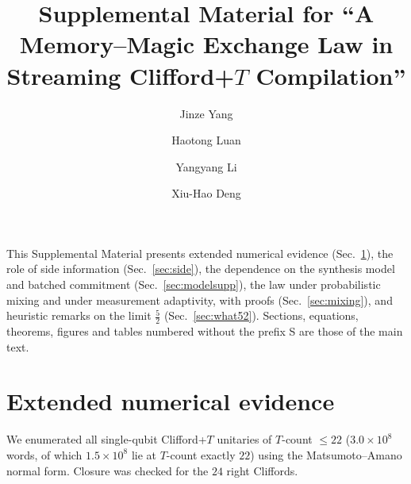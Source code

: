 \documentclass[aps,prx,twocolumn,superscriptaddress,nofootinbib,longbibliography]{revtex4-2}
\theoremstyle{plain}
\theoremstyle{definition}
\theoremstyle{remark}
\begin{document}
\title{Supplemental Material for ``A Memory--Magic Exchange Law in Streaming \texorpdfstring{Clifford+$T$}{Clifford+T} Compilation''}


\author{Jinze Yang}

\author{Haotong Luan}

\author{Yangyang Li}

\author{Xiu-Hao Deng}

\maketitle

This Supplemental Material presents extended numerical evidence (Sec.~\ref{sec:numsupp}), the role of side information (Sec.~\ref{sec:side}), the dependence on the synthesis model and batched commitment (Sec.~\ref{sec:modelsupp}), the law under probabilistic mixing and under measurement adaptivity, with proofs (Sec.~\ref{sec:mixing}), and heuristic remarks on the limit $\tfrac52$ (Sec.~\ref{sec:what52}). Sections, equations, theorems, figures and tables numbered without the prefix S are those of the main text.

\section{Extended numerical evidence}\label{sec:numsupp}


We enumerated all single-qubit Clifford+$T$ unitaries of $T$-count $\le22$ ($3.0\times10^8$ words, of which $1.5\times10^8$ lie at $T$-count exactly $22$) using the Matsumoto--Amano normal form. Closure was checked for the $24$ right Cliffords.
\end{document}
